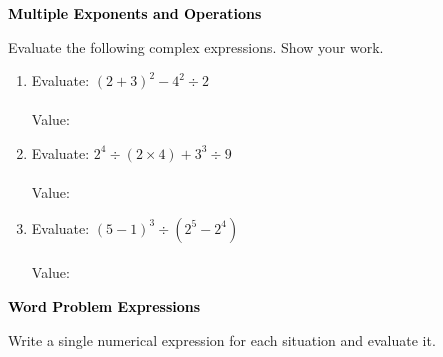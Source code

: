 \documentclass[12pt, letterpaper, fleqn]{article}
\newcommand{\blanklong}{\underline{\hspace{6.5cm}}}
\begin{document}
\newpage

\begin{tcolorbox}[colback=black!10]
\large\textcolor{black}{\textbf{Multiple Exponents and Operations}}
\end{tcolorbox}

\noindent
Evaluate the following complex expressions. Show your work.

\vspace{3mm}

\begin{enumerate}[itemsep=2.2cm, leftmargin=0.6cm]

\item Evaluate: $(2 + 3)^2 - 4^2 \div 2$ \\ \\
Value: \blanklong

\vspace{2cm}

\item Evaluate: $2^4 \div (2 \times 4) + 3^3 \div 9$ \\ \\
Value: \blanklong

\vspace{2cm}

\item Evaluate: $(5 - 1)^3 \div (2^5 - 2^4)$ \\ \\
Value: \blanklong

\vspace{2cm}

\end{enumerate}

\newpage

\begin{tcolorbox}[colback=black!10]
\large\textcolor{black}{\textbf{Word Problem Expressions}}
\end{tcolorbox}

\noindent
Write a single numerical expression for each situation and evaluate it.

\vspace{3mm}
\end{document}
